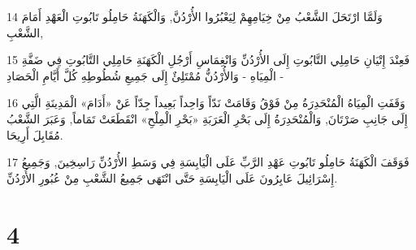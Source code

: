 \par 14 وَلَمَّا ارْتَحَلَ الشَّعْبُ مِنْ خِيَامِهِمْ لِيَعْبُرُوا الأُرْدُنَّ, وَالْكَهَنَةُ حَامِلُو تَابُوتِ الْعَهْدِ أَمَامَ الشَّعْبِ,
\par 15 فَعِنْدَ إِتْيَانِ حَامِلِي التَّابُوتِ إِلَى الأُرْدُنِّ وَانْغِمَاسِ أَرْجُلِ الْكَهَنَةِ حَامِلِي التَّابُوتِ فِي ضَفَّةِ الْمِيَاهِ - وَالأُرْدُنُّ مُمْتَلِئٌ إِلَى جَمِيعِ شُطُوطِهِ كُلَّ أَيَّامِ الْحَصَادِ -
\par 16 وَقَفَتِ الْمِيَاهُ الْمُنْحَدِرَةُ مِنْ فَوْقُ وَقَامَتْ نَدّاً وَاحِداً بَعِيداً جِدّاً عَنْ «أَدَامَ» الْمَدِينَةِ الَّتِي إِلَى جَانِبِ صَرْتَانَ, وَالْمُنْحَدِرَةُ إِلَى بَحْرِ الْعَرَبَةِ «بَحْرِ الْمِلْحِ» انْقَطَعَتْ تَمَاماً, وَعَبَرَ الشَّعْبُ مُقَابِلَ أَرِيحَا.
\par 17 فَوَقَفَ الْكَهَنَةُ حَامِلُو تَابُوتِ عَهْدِ الرَّبِّ عَلَى الْيَابِسَةِ فِي وَسَطِ الأُرْدُنِّ رَاسِخِينَ, وَجَمِيعُ إِسْرَائِيلَ عَابِرُونَ عَلَى الْيَابِسَةِ حَتَّى انْتَهَى جَمِيعُ الشَّعْبِ مِنْ عُبُورِ الأُرْدُنِّ.

\chapter{4}

